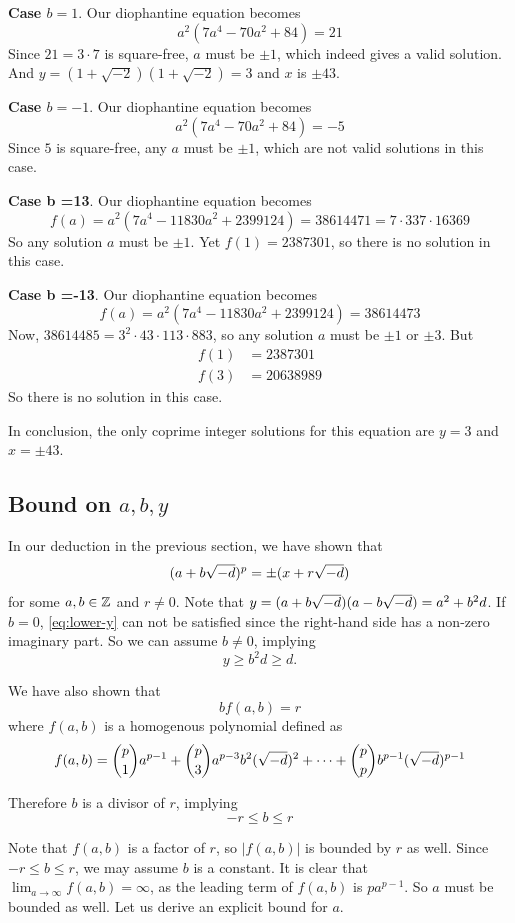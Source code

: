 \textbf{Case $b =1$}.
Our diophantine equation becomes
$$a^2(7 a^{4} - 70 a^{2} + 84)  = 21$$
Since $21 = 3\cdot 7$ is square-free, $a$ must be $\pm 1$, which indeed gives a valid solution.
And $y =(1+\sqrt{-2})(1+\sqrt{-2}) = 3$ and $x$ is $\pm 43$.

\textbf{Case $b =-1$}.
Our diophantine equation becomes
$$a^2(7 a^{4} - 70 a^{2} + 84)  = -5$$
Since $5$ is square-free, any $a$ must be $\pm 1$, which are not valid solutions in this case.

\textbf{Case b =13}.
Our diophantine equation becomes
$$f(a) = a^2(7a^4 - 11830 a^2 + 2399124) = 38614471 = 7 \cdot 337 \cdot 16369 $$
So any solution $a$ must be $\pm 1$. 
Yet $f(1) = 2387301 $, so there is no solution in this case.

\textbf{Case b =-13}.
Our diophantine equation becomes
$$f(a) = a^2(7a^4 - 11830 a^2 + 2399124) = 38614473$$
Now, $38614485 = 3^2 \cdot 43 \cdot 113 \cdot 883$, so any solution $a$ must be $\pm 1$ or $\pm 3$.
But 
\begin{align*}
	f(1) &= 2387301 \\
	f(3) &= 20638989
\end{align*}
So there is no solution in this case.

In conclusion, the only coprime integer solutions for this equation are $y = 3$ and $x = \pm 43$.


\subsection{Bound on \texorpdfstring{$a, b, y$}{}}

In our deduction in the previous section, we have shown that 
\begin{equation}\label{eq:lower-y}
	(a + b\sqrt{-d})^p = \pm(x + r\sqrt{-d})
\end{equation}
for some $a, b \in \mathbb{Z}$ and $r \neq 0$.
Note that $y = (a + b\sqrt{-d}) (a - b\sqrt{-d}) = a^2 + b^2 d$.
If $b = 0$, \eqref{eq:lower-y} can not be satisfied since the right-hand side has a non-zero imaginary part.
So we can assume $b \neq 0$, implying
$$
y \geq b^2d \geq d.
$$

We have also shown that
$$
b f(a, b) = r
$$
where $f(a, b)$ is a homogenous polynomial defined as
$$
f(a, b) = \binom{p}{1} a^{p-1} + \binom{p}{3} a^{p-3} b^2 (\sqrt{-d})^2 + \cdots + \binom{p}{p} b^{p-1} (\sqrt{-d})^{p-1}
$$

Therefore $b$ is a divisor of $r$, implying
$$
-r \leq b \leq r
$$

Note that $f(a, b)$ is a factor of $r$, so $|f(a, b)|$ is bounded by $r$ as well. 
Since $-r\leq b \leq r$, we may assume $b$ is a constant. It is clear that $\lim_{a \rightarrow \infty} f(a, b) = \infty$, as the leading term of $f(a, b)$ is $p a^{p-1}$. 
So $a$ must be bounded as well.
Let us derive an explicit bound for $a$.

